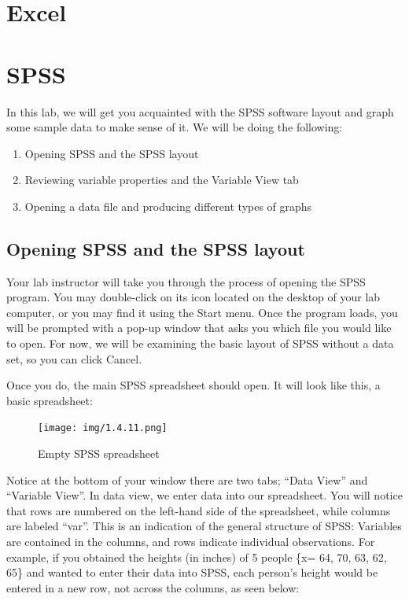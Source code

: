 \documentclass[
]{book}
\providecommand{\tightlist}{%
  \setlength{\itemsep}{0pt}\setlength{\parskip}{0pt}}
\begin{document}
\hypertarget{excel-1}{%
\section{Excel}\label{excel-1}}

\hypertarget{spss-1}{%
\section{SPSS}\label{spss-1}}

In this lab, we will get you acquainted with the SPSS software layout and graph some sample data to make sense of it. We will be doing the following:

\begin{enumerate}
\def\labelenumi{\arabic{enumi}.}
\tightlist
\item
  Opening SPSS and the SPSS layout
\item
  Reviewing variable properties and the Variable View tab
\item
  Opening a data file and producing different types of graphs
\end{enumerate}

\hypertarget{opening-spss-and-the-spss-layout-1}{%
\subsection{Opening SPSS and the SPSS layout}\label{opening-spss-and-the-spss-layout-1}}

Your lab instructor will take you through the process of opening the SPSS program. You may double-click on its icon located on the desktop of your lab computer, or you may find it using the Start menu. Once the program loads, you will be prompted with a pop-up window that asks you which file you would like to open. For now, we will be examining the basic layout of SPSS without a data set, so you can click {Cancel}.

Once you do, the main SPSS spreadsheet should open. It will look like this, a basic spreadsheet:

\begin{figure}
\centering
\texttt{[image: img/1.4.11.png]}
\caption{\label{fig:unnamed-chunk-42}Empty SPSS spreadsheet}
\end{figure}

Notice at the bottom of your window there are two tabs; ``Data View'' and ``Variable View''. In data view, we enter data into our spreadsheet. You will notice that rows are numbered on the left-hand side of the spreadsheet, while columns are labeled ``var''. This is an indication of the general structure of SPSS: Variables are contained in the columns, and rows indicate individual observations. For example, if you obtained the heights (in inches) of 5 people \{x= 64, 70, 63, 62, 65\} and wanted to enter their data into SPSS, each person's height would be entered in a new row, not across the columns, as seen below:
\end{document}
